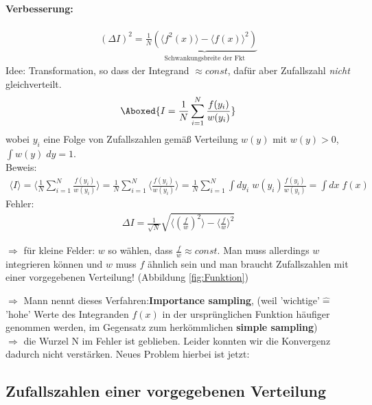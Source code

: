 \documentclass[12pt]{article}
\begin{document}
\paragraph{Verbesserung:}
\begin{align}
(\Delta I )^2 = \frac{1}{N} \underbrace{\left( \langle f^2(x) \rangle - \langle f(x)\rangle^2 \right)}_\text{Schwankungsbreite der Fkt}
\end{align}
Idee: Transformation, so dass der Integrand $\approx const$, dafür aber Zufallszahl \textit{nicht} gleichverteilt.
\begin{align}
\Aboxed{ I= \frac{1}{N} \sum_{i=1}^N \frac{f(y_i)}{w(y_i)} }
\end{align}
wobei $y_i$ eine Folge von Zufallszahlen gemäß Verteilung $w(y)$ mit $w(y)>0$, $\int w(y) \; dy=1$. \\
Beweis:
\begin{align}
\langle I\rangle = \langle \frac{1}{N} \sum_{i=1}^N \frac{f(y_i)}{w(y_i)} \rangle = \frac{1}{N} \sum_{i=1}^N \langle \frac{f(y_i)}{w(y_i)} \rangle = \frac{1}{N} \sum_{i=1}^N \int dy_i \; w(y_i)  \frac{f(y_i)}{w(y_i)} 
= \int dx \; f(x)
\end{align}
Fehler: \begin{align}
\Delta I=\frac{1}{\sqrt{N}}
 \sqrt{\langle \left(\frac{f}{w}\right)^2 \rangle - \langle \frac{f}{w} \rangle ^2}
 \end{align}
 
 

 
 
 $\Rightarrow$ für kleine Felder: $w$ so wählen, dass $\frac{f}{w} \approx const.$ Man muss allerdings $w$ integrieren können und $w$ muss $f$ ähnlich sein und man braucht Zufallszahlen mit einer vorgegebenen Verteilung! (Abbildung \ref{fig:Funktion})
 
 
 $\Rightarrow$ Mann nennt dieses Verfahren:\textbf{Importance sampling}, (weil 'wichtige'$\widehat{=}$ 'hohe' Werte des Integranden $f(x)$ in der ursprünglichen Funktion häufiger genommen werden, im Gegensatz zum herkömmlichen \textbf{simple sampling})\\ $\Rightarrow$ die Wurzel N im Fehler ist geblieben. Leider konnten wir die Konvergenz dadurch nicht verstärken. Neues Problem hierbei ist jetzt: 
 
 \subsection{Zufallszahlen einer vorgegebenen Verteilung}
 
\end{document}
